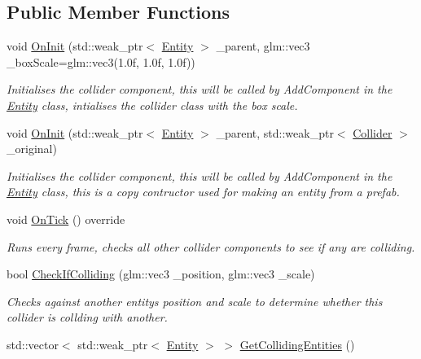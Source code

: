 \subsection*{Public Member Functions}
\begin{DoxyCompactItemize}
\item 
void \hyperlink{classfrontier_1_1_collider_aa11b97036f0962e2abcb79b4d84b8687}{On\+Init} (std\+::weak\+\_\+ptr$<$ \hyperlink{classfrontier_1_1_entity}{Entity} $>$ \+\_\+parent, glm\+::vec3 \+\_\+box\+Scale=glm\+::vec3(1.\+0f, 1.\+0f, 1.\+0f))
\begin{DoxyCompactList}\small\item\em Initialises the collider component, this will be called by Add\+Component in the \hyperlink{classfrontier_1_1_entity}{Entity} class, intialises the collider class with the box scale. \end{DoxyCompactList}\item 
void \hyperlink{classfrontier_1_1_collider_a06dfeb56017f45597f1812fc5cf8236d}{On\+Init} (std\+::weak\+\_\+ptr$<$ \hyperlink{classfrontier_1_1_entity}{Entity} $>$ \+\_\+parent, std\+::weak\+\_\+ptr$<$ \hyperlink{classfrontier_1_1_collider}{Collider} $>$ \+\_\+original)
\begin{DoxyCompactList}\small\item\em Initialises the collider component, this will be called by Add\+Component in the \hyperlink{classfrontier_1_1_entity}{Entity} class, this is a copy contructor used for making an entity from a prefab. \end{DoxyCompactList}\item 
void \hyperlink{classfrontier_1_1_collider_ac03782c94e8f7a2064ea1441cbd12c81}{On\+Tick} () override
\begin{DoxyCompactList}\small\item\em Runs every frame, checks all other collider components to see if any are colliding. \end{DoxyCompactList}\item 
bool \hyperlink{classfrontier_1_1_collider_aa0269702eb2d87a12087e933821ad6e0}{Check\+If\+Colliding} (glm\+::vec3 \+\_\+position, glm\+::vec3 \+\_\+scale)
\begin{DoxyCompactList}\small\item\em Checks against another entity\textquotesingle{}s position and scale to determine whether this collider is collding with another. \end{DoxyCompactList}\item 
std\+::vector$<$ std\+::weak\+\_\+ptr$<$ \hyperlink{classfrontier_1_1_entity}{Entity} $>$ $>$ \hyperlink{classfrontier_1_1_collider_a95ae710a5b6e370fc79967ff650f2f6f}{Get\+Colliding\+Entities} ()

\end{DoxyCompactItemize}
